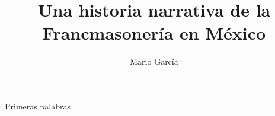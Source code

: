 \documentclass[openright]{book}
\title{Una historia narrativa de la Francmasonería en México}
\author{Mario García}
\begin{document}
\maketitle

Primeras palabras


\end{document}
